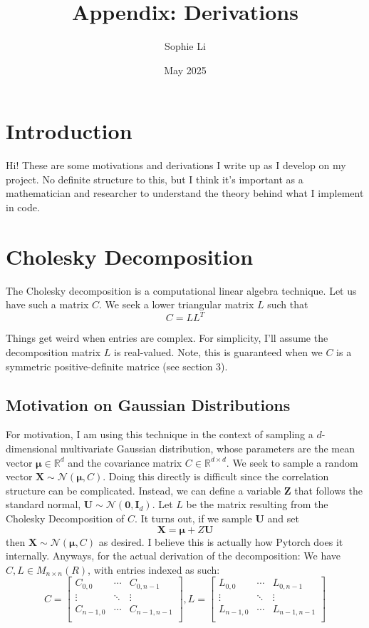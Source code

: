 \documentclass{article}
\title{Appendix: Derivations}
\author{Sophie Li }
\date{May 2025}
\begin{document}
\maketitle

\section{Introduction}
Hi! These are some motivations and derivations I write up as I develop on my project. No definite structure to this, but I think it's important as a mathematician and researcher to understand the theory behind what I implement in code.  

\section{Cholesky Decomposition}
The Cholesky decomposition is a computational linear algebra technique. 
Let us have such a matrix $C$. We seek a lower triangular matrix $L$ such that 
$$ C = LL^T$$

\noindent Things get weird when entries are complex. For simplicity, I'll assume the decomposition matrix $L$ is real-valued. Note, this is guaranteed when we $C$ is a symmetric positive-definite matrice (see section 3). \bigskip
\subsection{Motivation on Gaussian Distributions}
For motivation, I am using this technique in the context of sampling a $d$-dimensional multivariate Gaussian distribution, whose parameters are the mean vector $\boldsymbol{\mu} \in \mathbb{R}^d$ and the covariance matrix $C \in \mathbb{R}^{d \times d}$. 
We seek to sample a random vector $\mathbf{X} \sim \mathcal{N}(\boldsymbol{\mu}, C)$. Doing this directly is difficult since the correlation structure can be complicated. 
Instead, we can define a variable $\mathbf{Z}$ that follows the standard normal, $\mathbf{U} \sim \mathcal{N}(\boldsymbol{0}, \mathbf{I}_d)$. Let $L$ be the matrix resulting from the Cholesky Decomposition of $C$. It turns out, if we sample $\mathbf{U}$ and set 
$$ \mathbf{X} = \boldsymbol{\mu} + Z\mathbf{U}$$
then $\mathbf{X} \sim \mathcal{N}(\boldsymbol{\mu}, C)$ as desired. I believe this is actually how Pytorch does it internally. \bigskip
\newline
Anyways, for the actual derivation of the decomposition: 
We have $C,L \in M_{n \times n}(R)$, with entries indexed as such: 
$$ C = \begin{bmatrix}
C_{0,0} & \cdots & C_{0,n-1} \\
\vdots & \ddots & \vdots \\
C_{n-1,0} & \cdots & C_{n-1,n-1} \\
\end{bmatrix}, L = \begin{bmatrix}
L_{0,0} & \cdots & L_{0,n-1} \\
\vdots & \ddots & \vdots \\
L_{n-1,0} & \cdots & L_{n-1,n-1} \\
\end{bmatrix}
$$
\end{document}
